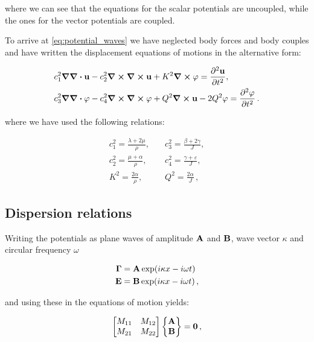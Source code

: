 \documentclass[12pt]{article}
\begin{document}
where we can see that the equations for the scalar potentials are uncoupled, while the ones
for the vector potentials are coupled.

To arrive at \eqref{eq:potential_waves} we have neglected body forces and body couples and have written the displacement equations of motions in the alternative form:

\begin{subequations}
  \begin{align}\label{eq:disp_waves}
    & c_1^2 \grad\div\vb{u} - c_2^2\curl\curl\vb{u} + K^2 \curl\vb{\varphi} =  \pdv[2]{\vb{u}}{t}, \\
    & c_3^2 \grad\div\vb{\varphi} - c_4^2 \curl\curl\vb{\varphi} +  Q^2 \curl\vb{u} - 2Q^2 \vb{\varphi} = \pdv[2]{\vb{\varphi}}{t}\, .
  \end{align}
\end{subequations}

where we have used the following relations:

\begin{equation*}
\begin{split}
c_1^2 = \frac{\lambda +2\mu}{\rho},\quad &c_3^2 =\frac{\beta +2\gamma}{J},\\
c_2^2 = \frac{\mu +\alpha}{\rho},\quad &c_4^2 =\frac{\gamma + \varepsilon}{J},\\
K^2= \frac{2\alpha}{\rho},\quad &Q^2 =\frac{2\alpha}{J} \, ,
\end{split}
\end{equation*}





\subsection{Dispersion relations}
Writing the potentials as plane waves of amplitude $ \vb{A}$ and $ \vb{B}$, wave vector $\kappa$ and circular frequency $\omega$

\begin{align*}
\vb{\Gamma} &= \vb{A}\exp(i\kappa x - i\omega t)\\
\vb{E} &= \vb{B}\exp(i\kappa x - i\omega t)\, ,
\end{align*}


and using these in the equations of motion yields:

\[\begin{bmatrix}
M_{11} &M_{12}\\
M_{21} &M_{22}\end{bmatrix}
\begin{Bmatrix} \vb{A}\\ \vb{B}\end{Bmatrix}
= \vb{0}\, ,\]
\end{document}
